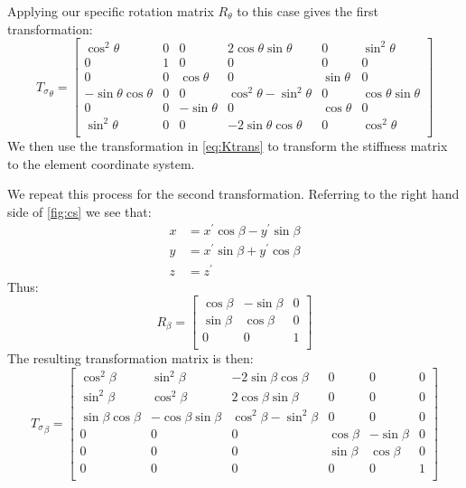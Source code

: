 \documentclass{article}
\begin{document}
Applying our specific rotation matrix $R_\theta$ to this case gives the first transformation:
\begin{equation}
{T_\sigma}_\theta =
\begin{bmatrix}
\cos^2\theta & 0 & 0 & 2 \cos\theta \sin\theta & 0 & \sin^2\theta \\
0 & 1 & 0 & 0 & 0 & 0 \\
0 & 0 & \cos\theta & 0 & \sin\theta & 0 \\
-\sin\theta\cos\theta & 0 & 0 & \cos^2\theta-\sin^2\theta & 0 & \cos\theta \sin\theta \\
0 & 0 & -\sin\theta & 0 & \cos\theta & 0 \\
\sin^2\theta & 0 & 0 & -2\sin\theta\cos\theta & 0 & \cos^2\theta \\
\end{bmatrix}
\end{equation}
We then use the transformation in  \cref{eq:Ktrans} to transform the stiffness matrix to the element coordinate system.

We repeat this process for the second transformation. Referring to the right hand side of \cref{fig:cs} we see that:
\begin{equation}
\begin{aligned}
    x &= x^\prime \cos\beta - y^\prime \sin\beta\\
    y &= x^\prime \sin\beta + y^\prime \cos\beta\\
    z &= z^\prime
\end{aligned}
\end{equation}
Thus:
\begin{equation}
R_\beta = \begin{bmatrix}
\cos\beta & -\sin\beta & 0 \\
\sin\beta & \cos\beta & 0 \\
0 & 0 & 1\\
\end{bmatrix}
\end{equation}
The resulting transformation matrix is then:
\begin{equation}
{T_\sigma}_\beta =
\begin{bmatrix}
    \cos^2\beta & \sin^2\beta & -2\sin\beta\cos\beta & 0 & 0 & 0 \\
    \sin^2\beta & \cos^2\beta & 2 \cos\beta \sin\beta & 0 & 0 & 0 \\
\sin\beta\cos\beta & -\cos\beta \sin\beta & \cos^2\beta-\sin^2\beta & 0 & 0 & 0 \\
0 & 0 & 0 & \cos\beta & -\sin\beta & 0 \\
0 & 0 & 0 & \sin\beta & \cos\beta & 0 \\
0 & 0 & 0 & 0 & 0 & 1 \\
\end{bmatrix}
\end{equation}
\end{document}
